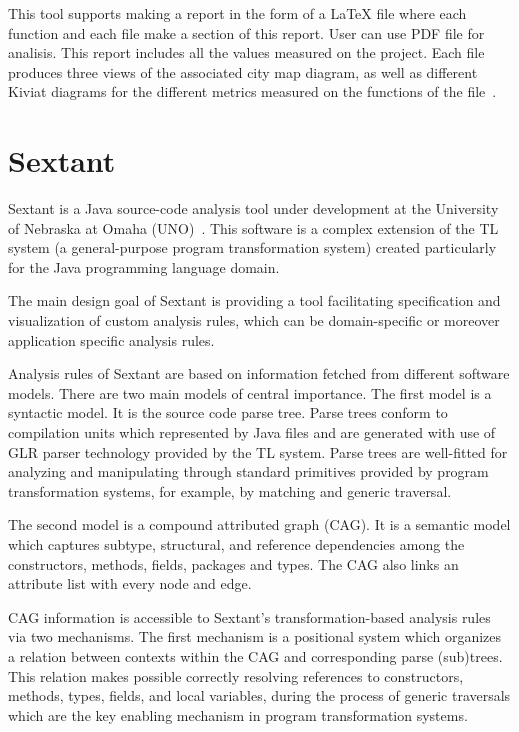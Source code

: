 This tool supports making a report in the form of a LaTeX file where each function and each file make a section of this report. User can use PDF file for analisis. This report includes all the values measured on the project. Each file produces three views of the associated city map diagram, as well as different Kiviat diagrams for the different metrics measured on the functions of the file~\cite{metrix}. 

\section{Sextant}

Sextant is a Java source-code analysis tool under development at the University of Nebraska at Omaha (UNO)~\cite{sextant}. This software is a complex extension of the TL system (a general-purpose program transformation system) created particularly for the Java programming language domain.

The main design goal of Sextant is providing a tool facilitating specification and visualization of custom analysis rules, which can be domain-specific or moreover application specific analysis rules.

Analysis rules of Sextant are based on information fetched from different software models. There are two main models of central importance. The first model is a syntactic model. It is the source code parse tree. Parse trees conform to compilation units which represented by Java files and are generated with use of GLR parser technology provided by the TL system. Parse trees are well-fitted for analyzing and manipulating through standard primitives provided by program transformation systems, for example, by matching and generic traversal.

The second model is a compound attributed graph (CAG). It is a semantic model which captures subtype, structural, and reference dependencies among the constructors, methods, fields, packages and types. The CAG also links an attribute list with every node and edge.

CAG information is accessible to Sextant’s transformation-based analysis rules via two mechanisms. The first mechanism is a positional system which organizes a relation between contexts within the CAG and corresponding parse (sub)trees. This relation makes possible correctly resolving references to constructors, methods, types, fields, and local variables, during the process of generic traversals which are the key enabling mechanism in program transformation systems.

